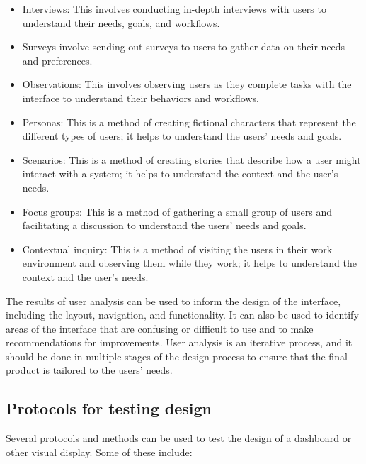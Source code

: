 \documentclass[print]{nuthesis}
\providecommand{\tightlist}{%
  \setlength{\itemsep}{0pt}\setlength{\parskip}{0pt}}
\begin{document}
\begin{itemize}
\tightlist
\item
  Interviews: This involves conducting in-depth interviews with users to understand their needs, goals, and workflows.
\item
  Surveys involve sending out surveys to users to gather data on their needs and preferences.
\item
  Observations: This involves observing users as they complete tasks with the interface to understand their behaviors and workflows.
\item
  Personas: This is a method of creating fictional characters that represent the different types of users; it helps to understand the users' needs and goals.
\item
  Scenarios: This is a method of creating stories that describe how a user might interact with a system; it helps to understand the context and the user's needs.
\item
  Focus groups: This is a method of gathering a small group of users and facilitating a discussion to understand the users' needs and goals.
\item
  Contextual inquiry: This is a method of visiting the users in their work environment and observing them while they work; it helps to understand the context and the user's needs.
\end{itemize}

The results of user analysis can be used to inform the design of the interface, including the layout, navigation, and functionality. It can also be used to identify areas of the interface that are confusing or difficult to use and to make recommendations for improvements. User analysis is an iterative process, and it should be done in multiple stages of the design process to ensure that the final product is tailored to the users' needs.

\hypertarget{protocols-for-testing-design}{%
\subsection{Protocols for testing design}\label{protocols-for-testing-design}}

Several protocols and methods can be used to test the design of a dashboard or other visual display. Some of these include:
\end{document}
